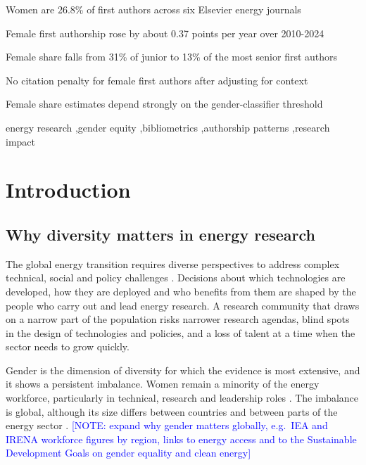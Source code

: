 \documentclass[preprint,12pt,number]{elsarticle}
\newcommand{\note}[1]{\textcolor{blue}{[NOTE: #1]}}
\begin{document}
\begin{frontmatter}
\begin{highlights}
\item Women are 26.8\% of first authors across six Elsevier energy journals
\item Female first authorship rose by about 0.37 points per year over 2010-2024
\item Female share falls from 31\% of junior to 13\% of the most senior first authors
\item No citation penalty for female first authors after adjusting for context
\item Female share estimates depend strongly on the gender-classifier threshold
\end{highlights}

\begin{keyword}
energy research \sep gender equity \sep bibliometrics \sep authorship patterns \sep research impact
\end{keyword}

\end{frontmatter}

\section{Introduction}

\subsection{Why diversity matters in energy research}

The global energy transition requires diverse perspectives to address complex technical, social and policy challenges \citep{UNESCO2017,Elsevier2020}. Decisions about which technologies are developed, how they are deployed and who benefits from them are shaped by the people who carry out and lead energy research. A research community that draws on a narrow part of the population risks narrower research agendas, blind spots in the design of technologies and policies, and a loss of talent at a time when the sector needs to grow quickly.

Gender is the dimension of diversity for which the evidence is most extensive, and it shows a persistent imbalance. Women remain a minority of the energy workforce, particularly in technical, research and leadership roles \citep{Pearl-Martinez2016,IRENA2019}. The imbalance is global, although its size differs between countries and between parts of the energy sector \citep{IRENA2019}. \note{expand why gender matters globally, e.g.\ IEA and IRENA workforce figures by region, links to energy access and to the Sustainable Development Goals on gender equality and clean energy}
\end{document}
